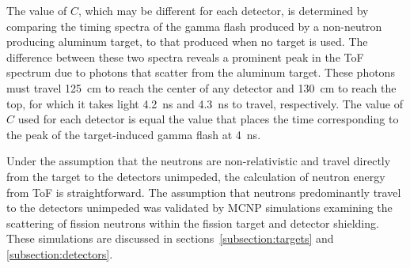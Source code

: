 \documentclass[%
 reprint,
 calc,
 amsmath,amssymb,
 aps,
 nofootinbib,
 linenumbers
]{revtex4-1}
\begin{document}
The value of $C$, which may be different for each detector, is determined by comparing the timing spectra of the gamma flash produced by a non-neutron producing aluminum target, to that produced when no target is used.
The difference between these two spectra reveals a prominent peak in the ToF spectrum due to photons that scatter from the aluminum target.
These photons must travel 125~cm to reach the center of any detector and 130~cm to reach the top, for which it takes light 4.2~ns and 4.3~ns to travel, respectively.
The value of $C$ used for each detector is equal the value that places the time corresponding to the peak of the target-induced gamma flash at 4~ns.

Under the assumption that the neutrons are non-relativistic and travel directly from the target to the detectors unimpeded, the calculation of neutron energy from ToF is straightforward.
The assumption that neutrons predominantly travel to the detectors unimpeded was validated by MCNP simulations examining the scattering of fission neutrons within the fission target and detector shielding. These simulations are discussed in sections~\ref{subsection:targets} and \ref{subsection:detectors}.

\end{document}
